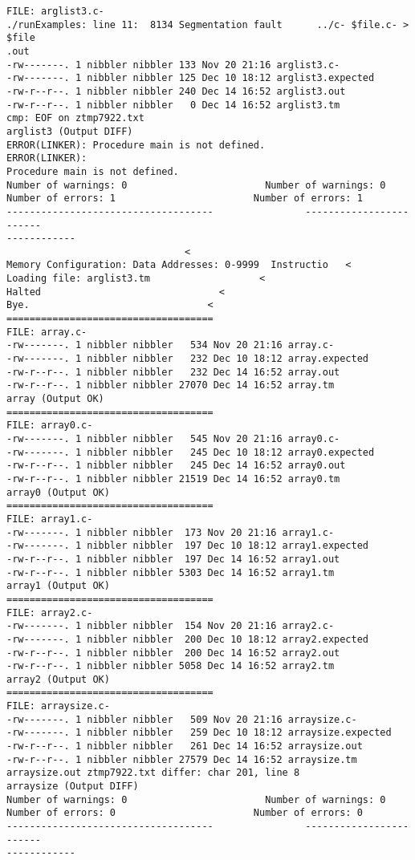 \documentclass[12pt]{book}
\begin{document}
\begin{lstlisting}
FILE: arglist3.c-
./runExamples: line 11:  8134 Segmentation fault      ../c- $file.c- > $file
.out
-rw-------. 1 nibbler nibbler 133 Nov 20 21:16 arglist3.c-
-rw-------. 1 nibbler nibbler 125 Dec 10 18:12 arglist3.expected
-rw-r--r--. 1 nibbler nibbler 240 Dec 14 16:52 arglist3.out
-rw-r--r--. 1 nibbler nibbler   0 Dec 14 16:52 arglist3.tm
cmp: EOF on ztmp7922.txt
arglist3 (Output DIFF)
ERROR(LINKER): Procedure main is not defined.            ERROR(LINKER): 
Procedure main is not defined.
Number of warnings: 0                        Number of warnings: 0
Number of errors: 1                        Number of errors: 1
------------------------------------                ------------------------
------------
                               <
Memory Configuration: Data Addresses: 0-9999  Instructio   <
Loading file: arglist3.tm                   <
Halted                               <
Bye.                               <
====================================
FILE: array.c-
-rw-------. 1 nibbler nibbler   534 Nov 20 21:16 array.c-
-rw-------. 1 nibbler nibbler   232 Dec 10 18:12 array.expected
-rw-r--r--. 1 nibbler nibbler   232 Dec 14 16:52 array.out
-rw-r--r--. 1 nibbler nibbler 27070 Dec 14 16:52 array.tm
array (Output OK)
====================================
FILE: array0.c-
-rw-------. 1 nibbler nibbler   545 Nov 20 21:16 array0.c-
-rw-------. 1 nibbler nibbler   245 Dec 10 18:12 array0.expected
-rw-r--r--. 1 nibbler nibbler   245 Dec 14 16:52 array0.out
-rw-r--r--. 1 nibbler nibbler 21519 Dec 14 16:52 array0.tm
array0 (Output OK)
====================================
FILE: array1.c-
-rw-------. 1 nibbler nibbler  173 Nov 20 21:16 array1.c-
-rw-------. 1 nibbler nibbler  197 Dec 10 18:12 array1.expected
-rw-r--r--. 1 nibbler nibbler  197 Dec 14 16:52 array1.out
-rw-r--r--. 1 nibbler nibbler 5303 Dec 14 16:52 array1.tm
array1 (Output OK)
====================================
FILE: array2.c-
-rw-------. 1 nibbler nibbler  154 Nov 20 21:16 array2.c-
-rw-------. 1 nibbler nibbler  200 Dec 10 18:12 array2.expected
-rw-r--r--. 1 nibbler nibbler  200 Dec 14 16:52 array2.out
-rw-r--r--. 1 nibbler nibbler 5058 Dec 14 16:52 array2.tm
array2 (Output OK)
====================================
FILE: arraysize.c-
-rw-------. 1 nibbler nibbler   509 Nov 20 21:16 arraysize.c-
-rw-------. 1 nibbler nibbler   259 Dec 10 18:12 arraysize.expected
-rw-r--r--. 1 nibbler nibbler   261 Dec 14 16:52 arraysize.out
-rw-r--r--. 1 nibbler nibbler 27579 Dec 14 16:52 arraysize.tm
arraysize.out ztmp7922.txt differ: char 201, line 8
arraysize (Output DIFF)
Number of warnings: 0                        Number of warnings: 0
Number of errors: 0                        Number of errors: 0
------------------------------------                ------------------------
------------


\end{lstlisting}
\end{document}
